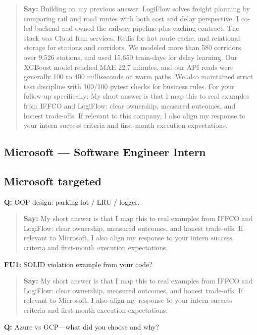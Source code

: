 \documentclass[9pt,a4paper]{article}
\begin{document}
\begin{quote}\small\textbf{Say:} Building on my previous answer: LogiFlow solves freight planning by comparing rail and road routes with both cost and delay perspective. I co-led backend and owned the railway pipeline plus caching contract. The stack was Cloud Run services, Redis for hot route cache, and relational storage for stations and corridors. We modeled more than 580 corridors over 9,526 stations, and used 15,650 train-days for delay learning. Our XGBoost model reached MAE 22.7 minutes, and our API reads were generally 100 to 400 milliseconds on warm paths. We also maintained strict test discipline with 100/100 pytest checks for business rules. For your follow-up specifically: My short answer is that I map this to real examples from IFFCO and LogiFlow: clear ownership, measured outcomes, and honest trade-offs. If relevant to this company, I also align my response to your intern success criteria and first-month execution expectations.\end{quote}
\vspace{2mm}
\newpage
\subsection{Microsoft --- Software Engineer Intern}
\subsection{Microsoft targeted}
\textbf{Q:} OOP design: parking lot / LRU / logger.

\begin{quote}\small\textbf{Say:} My short answer is that I map this to real examples from IFFCO and LogiFlow: clear ownership, measured outcomes, and honest trade-offs. If relevant to Microsoft, I also align my response to your intern success criteria and first-month execution expectations.\end{quote}
\vspace{2mm}
\textbf{FU1:} SOLID violation example from your code?

\begin{quote}\small\textbf{Say:} My short answer is that I map this to real examples from IFFCO and LogiFlow: clear ownership, measured outcomes, and honest trade-offs. If relevant to Microsoft, I also align my response to your intern success criteria and first-month execution expectations.\end{quote}
\vspace{2mm}
\textbf{Q:} Azure vs GCP---what did you choose and why?
\end{document}
